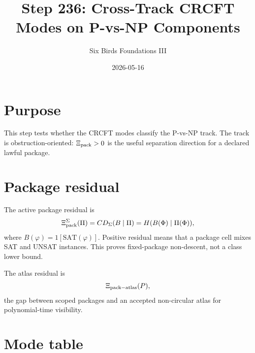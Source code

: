 \documentclass[11pt]{article}
\title{Step 236: Cross-Track CRCFT Modes on P-vs-NP Components}
\author{Six Birds Foundations III}
\date{2026-05-16}
\begin{document}
\maketitle

\section{Purpose}

This step tests whether the CRCFT modes classify the P-vs-NP track. The track is obstruction-oriented: \(\Xi_{\rm pack}>0\) is the useful separation direction for a declared lawful package.

\section{Package residual}

The active package residual is
\[
\Xi_{\rm pack}^{\Sigma}(\Pi)
=CD_{\Sigma}(B\mid\Pi)
=H(B(\Phi)\mid\Pi(\Phi)),
\]
where \(B(\varphi)=1[\mathrm{SAT}(\varphi)]\). Positive residual means that a package cell mixes SAT and UNSAT instances. This proves fixed-package non-descent, not a class lower bound.

The atlas residual is
\[
\Xi_{\rm pack-atlas}(P),
\]
the gap between scoped packages and an accepted non-circular atlas for polynomial-time visibility.

\section{Mode table}
\end{document}

